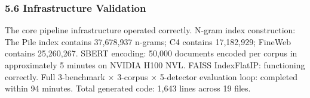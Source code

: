 \subsubsection{5.6 Infrastructure Validation}

The core pipeline infrastructure operated correctly. N-gram index construction: The Pile index contains 37,678,937 n-grams; C4 contains 17,182,929; FineWeb contains 25,260,267. SBERT encoding: 50,000 documents encoded per corpus in approximately 5 minutes on NVIDIA H100 NVL. FAISS IndexFlatIP: functioning correctly. Full 3-benchmark × 3-corpus × 5-detector evaluation loop: completed within 94 minutes. Total generated code: 1,643 lines across 19 files.


